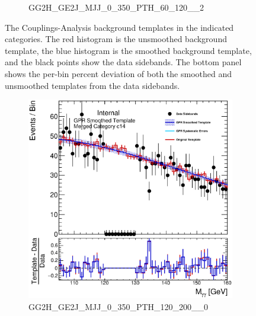 \begin{figure}
\begin{center}
\begin{subfigure}[T]{0.49\linewidth}
	\caption{GG2H\_GE2J\_MJJ\_0\_350\_PTH\_60\_120\_\_2}
\end{subfigure}
\caption{The Couplings-Analysis background templates in the indicated categories. The red histogram is the unsmoothed background template, the blue histogram is the smoothed background template, and the black points show the data sidebands. The bottom panel shows the per-bin percent deviation of both the smoothed and unsmoothed templates from the data sidebands. }
\label{fig:gpr_coupcat_3}
\end{center}
\end{figure}

\begin{figure}
\begin{center}
\begin{subfigure}[T]{0.49\linewidth}
	\centering
	\includegraphics[width=\linewidth]{figures/background/gpr/coupCatTemplates/GPR_Smoothed_Plot_hmgg_c14.eps}
	\caption{\tiny{GG2H\_GE2J\_MJJ\_0\_350\_PTH\_120\_200\_\_0}}
\end{subfigure}
\begin{subfigure}[T]{0.49\linewidth}
	\centering

\end{subfigure}
\end{center}
\end{figure}

